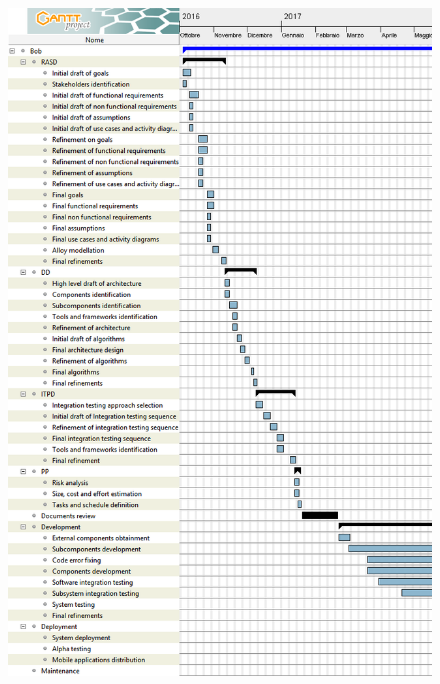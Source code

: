 \begin{figure}[H]
	\centering
	\includegraphics[height=\textheight, keepaspectratio]{resource_allocation/diagrams/ScheduleBob1.png}
\end{figure}

